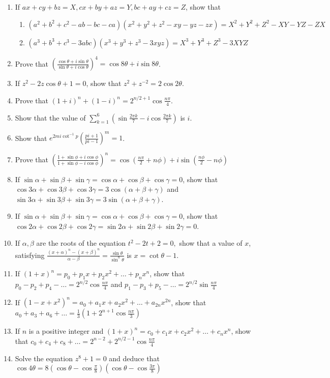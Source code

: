 \begin{enumerate}[resume]
\item If $ax + cy + bz = X, cx + by + az = Y, bc + ay + cz = Z$, show that
  \begin{enumerate}
  \item $(a^2 + b^2 + c^2 - ab - bc - ca)(x^2 + y^2 + z^2 - xy - yz - zx) = X^2 + Y^2 + Z^2 - XY - YZ - ZX$
  \item $(a^3 + b^3 + c^3 - 3abc)(x^3 + y^3 + z^3 - 3xyz) = X^3 + Y^3 + Z^3 - 3XYZ$
  \end{enumerate}
\item Prove that $\left(\frac{\cos\theta + i\sin\theta}{\sin\theta + i\cos\theta}\right)^4 = \cos8\theta + i\sin8\theta$.
\item If $z^2 - 2z\cos\theta + 1 = 0$, show that $z^2 + z^{-2} = 2\cos2\theta$.
\item Prove that $(1 + i)^n + (1 - i)^n = 2^{n/2 + 1}\cos\frac{n\pi}{4}$.
\item Show that the value of $\sum_{k = 1}^6\left(\sin\frac{2\pi k}{7} - i\cos\frac{2\pi k}{7}\right)$ is $i$.
\item Show that $e^{2mi\cot^{-1}p}\left(\frac{pi + 1}{pi - 1}\right)^m = 1$.
\item Prove that $\left(\frac{1 + \sin\phi + i\cos\phi}{1 + \sin\phi - i\cos\phi}\right)^n = \cos\left(\frac{n\pi}{2} +
  n\phi\right) + i\sin\left(\frac{n\phi}{2} - n\phi\right)$
\item If $\sin\alpha + \sin\beta + \sin\gamma = \cos\alpha + \cos\beta + \cos\gamma = 0$, show that $\cos3\alpha + \cos3\beta +
  \cos3\gamma = 3\cos(\alpha + \beta + \gamma)$ and $\sin3\alpha + \sin3\beta + \sin3\gamma = 3\sin(\alpha + \beta + \gamma)$.
\item If $\sin\alpha + \sin\beta + \sin\gamma = \cos\alpha + \cos\beta + \cos\gamma = 0$, show that $\cos2\alpha + \cos2\beta +
  \cos2\gamma = \sin2\alpha + \sin2\beta + \sin2\gamma = 0$.
\item If $\alpha, \beta$ are the roots of the equation $t^2 - 2t + 2 = 0,$ show that a value of $x$, satisfying $\frac{(x +
  \alpha)^n - (x + \beta)^n}{\alpha - \beta} = \frac{\sin\theta}{\sin^n\theta}$ is $x = \cot\theta - 1$.
\item If $(1 + x)^n = p_0 + p_1x + p_2x^2 + \ldots + p_nx^n$, show that $p_0 - p_2 + p_4 - \ldots = 2^{n/2}\cos\frac{n\pi}{4}$ and
  $p_1 - p_3 + p_5 - \ldots = 2^{n/2}\sin\frac{n\pi}{4}$
\item If $(1 - x + x^2)^n = a_0 + a_1x + a_2x^2 + \ldots + a_{2n}x^{2n}$, show that $a_0 + a_3 + a_6 + \ldots = \frac{1}{3}\left(1
  + 2^{n + 1}\cos\frac{n\pi}{3}\right)$
\item If $n$ is a positive integer and $(1 + x)^n = c_0 + c_1x + c_2x^2 + \ldots + c_nx^n$, show that $c_0 + c_4 + c_8 + \ldots =
  2^{n - 2} + 2^{n/2 - 1}\cos\frac{n\pi}{4}$
\item Solve the equation $z^8 + 1= 0$ and deduce that $\cos4\theta = 8\left(\cos\theta - \cos\frac{\pi}{8}\right)\left(\cos\theta -
  \cos\frac{3\pi}{8}\right)$


\end{enumerate}
